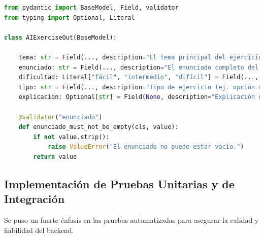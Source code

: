\begin{lstlisting}[language=python,
                   caption={Schema Pydantic (\texttt{AIExerciseOut}) para validar la respuesta JSON del motor de IA.},
                   label={lst:desarrollo_ai-schema_response}, % Label actualizada
                   basicstyle=\fontsize{8}{9.5}\ttfamily]
from pydantic import BaseModel, Field, validator
from typing import Optional, Literal

class AIExerciseOut(BaseModel):
    
    tema: str = Field(..., description="El tema principal del ejercicio.")
    enunciado: str = Field(..., description="El enunciado completo del ejercicio.")
    dificultad: Literal["fácil", "intermedio", "difícil"] = Field(..., description="Nivel de dificultad del ejercicio.")
    tipo: str = Field(..., description="Tipo de ejercicio (ej. opción múltiple, respuesta corta).")
    explicacion: Optional[str] = Field(None, description="Explicación detallada de la solución.")

    @validator("enunciado")
    def enunciado_must_not_be_empty(cls, value):
        if not value.strip():
            raise ValueError("El enunciado no puede estar vacío.")
        return value
\end{lstlisting}

\subsection{Implementación de Pruebas Unitarias y de Integración}
\label{ssec:desarrollo_iter2_tests}

Se puso un fuerte énfasis en las pruebas automatizadas para asegurar la calidad y fiabilidad del backend.

